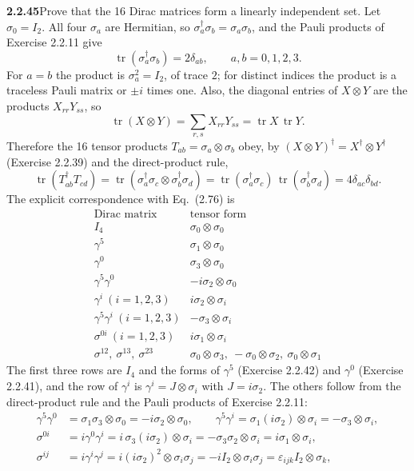 \par\bigskip
\noindent\textbf{2.2.45}\quad Prove that the 16 Dirac matrices form a linearly
independent set.
\solution
Let $\sigma_0=I_2$. All four $\sigma_a$ are Hermitian, so
$\sigma_a^\dagger\sigma_b=\sigma_a\sigma_b$, and the Pauli products of
Exercise 2.2.11 give
\[
\operatorname{tr}(\sigma_a^\dagger\sigma_b)=2\delta_{ab},
\qquad a,b=0,1,2,3.
\]
For $a=b$ the product is $\sigma_a^2=I_2$, of trace $2$; for distinct
indices the product is a traceless Pauli matrix or $\pm i$ times one.
Also, the diagonal entries of $X\otimes Y$ are the products
$X_{rr}Y_{ss}$, so
\[
\operatorname{tr}(X\otimes Y)=\sum_{r,s}X_{rr}Y_{ss}
=\operatorname{tr}X\,\operatorname{tr}Y.
\]
Therefore the 16 tensor products $T_{ab}=\sigma_a\otimes\sigma_b$ obey,
by $(X\otimes Y)^\dagger=X^\dagger\otimes Y^\dagger$ (Exercise 2.2.39)
and the direct-product rule,
\[
\operatorname{tr}(T_{ab}^\dagger T_{cd})
=\operatorname{tr}(\sigma_a^\dagger\sigma_c\otimes\sigma_b^\dagger\sigma_d)
=\operatorname{tr}(\sigma_a^\dagger\sigma_c)\,
\operatorname{tr}(\sigma_b^\dagger\sigma_d)
=4\delta_{ac}\delta_{bd}.
\]
The explicit correspondence with Eq.~(2.76) is
\[
\begin{array}{c|c}
\text{Dirac matrix}&\text{tensor form}\\\hline
I_4&\sigma_0\otimes\sigma_0\\
\gamma^5&\sigma_1\otimes\sigma_0\\
\gamma^0&\sigma_3\otimes\sigma_0\\
\gamma^5\gamma^0&-i\sigma_2\otimes\sigma_0\\
\gamma^i\ (i=1,2,3)&i\sigma_2\otimes\sigma_i\\
\gamma^5\gamma^i\ (i=1,2,3)&-\sigma_3\otimes\sigma_i\\
\sigma^{0i}\ (i=1,2,3)&i\sigma_1\otimes\sigma_i\\
\sigma^{12},\ \sigma^{13},\ \sigma^{23}
&\sigma_0\otimes\sigma_3,\ -\sigma_0\otimes\sigma_2,\
\sigma_0\otimes\sigma_1
\end{array}
\]
The first three rows are $I_4$ and the forms of $\gamma^5$
(Exercise 2.2.42) and $\gamma^0$ (Exercise 2.2.41), and the row of
$\gamma^i$ is $\gamma^i=J\otimes\sigma_i$ with $J=i\sigma_2$. The
others follow from the direct-product rule and the Pauli products of
Exercise 2.2.11:
\[
\begin{aligned}
\gamma^5\gamma^0&=\sigma_1\sigma_3\otimes\sigma_0
=-i\sigma_2\otimes\sigma_0,\qquad
\gamma^5\gamma^i=\sigma_1(i\sigma_2)\otimes\sigma_i
=-\sigma_3\otimes\sigma_i,\\
\sigma^{0i}&=i\gamma^0\gamma^i=i\,\sigma_3(i\sigma_2)\otimes\sigma_i
=-\sigma_3\sigma_2\otimes\sigma_i=i\sigma_1\otimes\sigma_i,\\
\sigma^{ij}&=i\gamma^i\gamma^j=i(i\sigma_2)^2\otimes\sigma_i\sigma_j
=-iI_2\otimes\sigma_i\sigma_j=\varepsilon_{ijk}I_2\otimes\sigma_k,
\end{aligned}
\]
